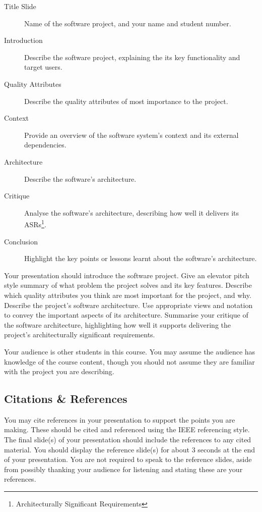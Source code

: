 \documentclass{csse4400}
\begin{document}
\begin{description}
    \item[Title Slide] Name of the software project, and your name and student number.
    \item[Introduction] Describe the software project, explaining the its key functionality and target users.
    \item[Quality Attributes] Describe the quality attributes of most importance to the project.
    \item[Context] Provide an overview of the software system's context and its external dependencies.
    \item[Architecture] Describe the software's architecture.
    \item[Critique] Analyse the software's architecture, describing how well it delivers its ASRs\footnote{Architecturally Significant Requirements}.
    \item[Conclusion] Highlight the key points or lessons learnt about the software's architecture.
\end{description}

Your presentation should introduce the software project.
Give an elevator pitch style summary of what problem the project solves and its key features.
Describe which quality attributes you think are most important for the project, and why.
Describe the project's software architecture. Use appropriate views and notation to convey the important aspects of its architecture.
Summarise your critique of the software architecture, highlighting how well it supports delivering the project's architecturally significant requirements.

Your audience is other students in this course. You may assume the audience has knowledge of the course content,
though you should not assume they are familiar with the project you are describing.

\subsection{Citations \& References}
You may cite references in your presentation to support the points you are making.
These should be cited and referenced using the IEEE referencing style.
The final slide(s) of your presentation should include the references to any cited material.
You should display the reference slide(s) for about 3 seconds at the end of your presentation.
You are not required to speak to the reference slides,
aside from possibly thanking your audience for listening and stating these are your references.
\end{document}
